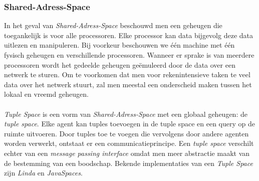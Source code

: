 \subsubsection{Shared-Adress-Space}

In het geval van \emph{Shared-Adress-Space} beschouwd men een geheugen die toegankelijk is voor alle processoren. Elke processor kan data bijgevolg deze data uitlezen en manipuleren. Bij voorkeur beschouwen we \'e\'en machine met \'e\'en fysisch geheugen en verschillende processoren. Wanneer er sprake is van meerdere processoren wordt het gedeelde geheugen ge\"emuleerd door de data over een netwerk te sturen. Om te voorkomen dat men voor rekenintensieve taken te veel data over het netwerk stuurt, zal men meestal een onderscheid maken tussen het lokaal en vreemd geheugen.\cite{books/bc/KumarGGK94}

\paragraph{}
\emph{Tuple Space} is een vorm van \emph{Shared-Adress-Space} met een globaal geheugen: de \emph{tuple space}. Elke agent kan tuples toevoegen in de tuple space en een query op de ruimte uitvoeren. Door tuples toe te voegen die vervolgens door andere agenten worden verwerkt, ontstaat er een communicatieprincipe. Een \emph{tuple space} verschilt echter van een \emph{message passing interface} omdat men meer abstractie maakt van de bestemming van een boodschap. Bekende implementaties van een \emph{Tuple Space} zijn \emph{Linda} en \emph{JavaSpaces}.\cite{books/bc/KumarGGK94,books/daglib/0066939,books/daglib/0015079,Gelernter85,javaspaces}